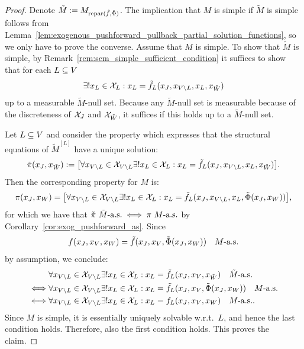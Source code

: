 \begin{proof}
  Denote $\tilde{M} := M_{\mathrm{repar}({\tilde{f}},{\tilde{\Phi}})}$.
  The implication that $M$ is simple if $\tilde{M}$ is simple follows from Lemma~\ref{lem:exogenous_pushforward_pullback_partial_solution_functions}, so we only have to prove the converse.
  Assume that $M$ is simple.
  To show that $\tilde{M}$ is simple, by Remark~\ref{rem:scm_simple_sufficient_condition} it suffices to show that for each $L \subseteq V$
  $$\exists! x_L \in \mathcal{X}_L : x_{L} = \tilde f_L(x_J,x_{V\setminus L},x_L,x_{\tilde W})$$
  up to a measurable $\tilde M$-null set.
  Because any $\tilde M$-null set is measurable because of the discreteness of $\mathcal{X}_J$ and $\mathcal{X}_{\tilde W}$, it suffices if this holds up to a $\tilde M$-null set.

  Let $L \subseteq V$ and consider the property which expresses that the structural equations of $\tilde M^{[L]}$ have a unique solution:
  $$\tilde\pi(x_J,x_{\tilde{W}}) := \big[\forall x_{V\setminus L} \in \mathcal{X}_{V \setminus L} \exists! x_L \in \mathcal{X}_L : x_L = \tilde f_L(x_J,x_{V\setminus L},x_L,x_{\tilde{W}})\big].$$
  Then the corresponding property for $M$ is:
  $$\pi(x_J,x_W) = \big[\forall x_{V\setminus L} \in \mathcal{X}_{V \setminus L} \exists! x_L \in \mathcal{X}_L : x_L = \tilde f_L(x_J,x_{V\setminus L},x_L,\tilde\Phi(x_J,x_W)) \big],$$
  for which we have that $\tilde\pi\ \tilde{M}\text{-a.s.} \iff \pi\ M\text{-a.s.}$ by Corollary~\ref{cor:exog_pushforward_as}.
  Since 
  $$f(x_J,x_V,x_W) = \tilde f(x_J,x_V,\tilde\Phi(x_J,x_W))\quad M\text{-a.s.}$$ 
  by assumption, we conclude:
  \begin{equation*}\begin{split}
    & \forall x_{V\setminus L} \in \mathcal{X}_{V \setminus L} \exists! x_L \in \mathcal{X}_L : x_L = \tilde f_L(x_J,x_V,x_{\tilde{W}}) \quad \tilde{M}\text{-a.s.} \\
    \iff & \forall x_{V\setminus L} \in \mathcal{X}_{V \setminus L} \exists! x_L \in \mathcal{X}_L : x_L = \tilde f_L(x_J,x_V,\tilde\Phi(x_J,x_W)) \quad M\text{-a.s.} \\
    \iff & \forall x_{V\setminus L} \in \mathcal{X}_{V \setminus L} \exists! x_L \in \mathcal{X}_L : x_L = f_L(x_J,x_V,x_W) \quad M\text{-a.s.}.
    \end{split}
  \end{equation*}
  Since $M$ is simple, it is essentially uniquely solvable w.r.t.\ $L$, and hence the last condition holds.
  Therefore, also the first condition holds.
  This proves the claim.
\end{proof}

